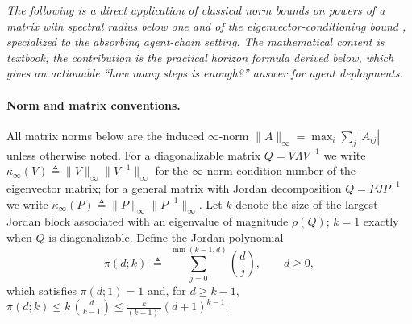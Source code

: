 
\noindent\emph{The following is a direct application of classical
norm bounds on powers of a matrix with spectral radius below one
\cite[Ch.~3]{hornjohnson2013} and of the eigenvector-conditioning
bound \cite[Ch.~1]{stewart1998}, specialized to the absorbing
agent-chain setting. The mathematical content is textbook; the
contribution is the \emph{practical horizon} formula derived below,
which gives an actionable ``how many steps is enough?'' answer for
agent deployments.}

\paragraph{Norm and matrix conventions.}
All matrix norms below are the induced $\infty$-norm
$\|A\|_\infty = \max_i \sum_j |A_{ij}|$ unless otherwise noted.
For a diagonalizable matrix $Q = V\Lambda V^{-1}$ we write
$\kappa_\infty(V)\triangleq \|V\|_\infty\|V^{-1}\|_\infty$ for the
$\infty$-norm condition number of the eigenvector matrix; for a
general matrix with Jordan decomposition $Q = P J P^{-1}$ we write
$\kappa_\infty(P) \triangleq \|P\|_\infty\|P^{-1}\|_\infty$.  Let $k$
denote the size of the largest Jordan block associated with an
eigenvalue of magnitude $\rho(Q)$; $k=1$ exactly when $Q$ is
diagonalizable.  Define the Jordan polynomial
\begin{equation}
\pi(d;k) \;\triangleq\; \sum_{j=0}^{\min(k-1,d)} \binom{d}{j},
\qquad d\ge 0,
\label{eq:jordan-poly}
\end{equation}
which satisfies $\pi(d;1)=1$ and, for $d\ge k-1$,
$\pi(d;k)\le k\,\binom{d}{k-1}\le \tfrac{k}{(k-1)!}(d+1)^{k-1}$.

